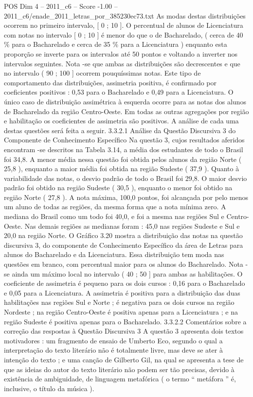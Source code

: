 \begin{textsample}{POS Dim 4 – 2011\_c6 – Score -1.00 – 2011\_c6/enade\_2011\_letras\_por\_385230ec73.txt}
As modas destas distribuições ocorrem no primeiro intervalo, [ 0 ; 10 ].
O percentual de alunos de Licenciatura com notas no intervalo [ 0 ; 10 ] é menor do que o de Bacharelado, ( cerca de 40 \% para o Bacharelado e cerca de 35 \% para a Licenciatura ) enquanto esta proporção se inverte para os intervalos até 50 pontos e voltando a inverter nos intervalos seguintes.
Nota -se que ambas as distribuições são decrescentes e que no intervalo ( 90 ; 100 ] ocorrem pouquíssimas notas.
Este tipo de comportamento das distribuições, assimetria positiva, é confirmado por coeficientes positivos : 0,53 para o Bacharelado e 0,49 para a Licenciatura.
O único caso de distribuição assimétrica à esquerda ocorre para as notas dos alunos de Bacharelado da região Centro-Oeste.
Em todas as outras agregações por região e habilitação os coeficientes de assimetria são positivos.
A análise de cada uma destas questões será feita a seguir. 3.3.2.1 Análise da Questão Discursiva 3 do Componente de Conhecimento Específico Na questão 3, cujos resultados aferidos encontram -se descritos na Tabela 3.14, a média dos estudantes de todo o Brasil foi 34,8.
A menor média nessa questão foi obtida pelos alunos da região Norte ( 25,8 ), enquanto a maior média foi obtida na região Sudeste ( 37,9 ).
Quanto à variabilidade das notas, o desvio padrão de todo o Brasil foi 29,8.
O maior desvio padrão foi obtido na região Sudeste ( 30,5 ), enquanto o menor foi obtido na região Norte ( 27,8 ).
A nota máxima, 100,0 pontos, foi alcançada por pelo menos um aluno de todas as regiões, da mesma forma que a nota mínima zero.
A mediana do Brasil como um todo foi 40,0, e foi a mesma nas regiões Sul e Centro-Oeste.
Nas demais regiões as medianas foram : 45,0 nas regiões Sudeste e Sul e 20,0 na região Norte.
O Gráfico 3.20 mostra a distribuição das notas na questão discursiva 3, do componente de Conhecimento Específico da área de Letras para alunos do Bacharelado e da Licenciatura.
Essa distribuição tem moda nas questões em branco, com percentual maior para os alunos do Bacharelado.
Nota -se ainda um máximo local no intervalo ( 40 ; 50 ] para ambas as habilitações.
O coeficiente de assimetria é pequeno para os dois cursos : 0,16 para o Bacharelado e 0,05 para a Licenciatura.
A assimetria é positiva para a distribuição das duas habilitações nas regiões Sul e Norte ; é negativa para os dois cursos na região Nordeste ; na região Centro-Oeste é positiva apenas para a Licenciatura ; e na região Sudeste é positiva apenas para o Bacharelado. 3.3.2.2 Comentários sobre a correção das respostas à Questão Discursiva 3 A questão 3 apresenta dois textos motivadores : um fragmento de ensaio de Umberto Eco, segundo o qual a interpretação do texto literário não é totalmente livre, mas deve se ater à intenção do texto ; e uma canção de Gilberto Gil, na qual se apresenta a tese de que as ideias do autor do texto literário não podem ser tão precisas, devido à existência de ambiguidade, de linguagem metafórica ( o termo “ metáfora ” é, inclusive, o título da música ).

\end{textsample}
